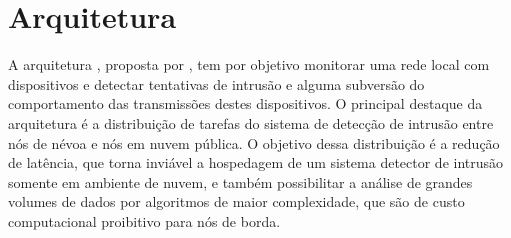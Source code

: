 
\section{Arquitetura \arch}\label{sec:cassales}

A arquitetura \arch, proposta por , tem por objetivo
monitorar uma rede local com dispositivos \iot e detectar tentativas de intrusão
e alguma subversão do comportamento das transmissões destes dispositivos.
O principal destaque da arquitetura é a distribuição de tarefas do sistema de
detecção de intrusão entre nós de névoa e nós em nuvem pública.
O objetivo dessa distribuição é a redução de latência, que torna inviável a
hospedagem de um sistema detector de intrusão somente em ambiente de nuvem, e
também possibilitar a análise de grandes volumes de dados por algoritmos de
maior complexidade, que são de custo computacional proibitivo para nós de borda.

